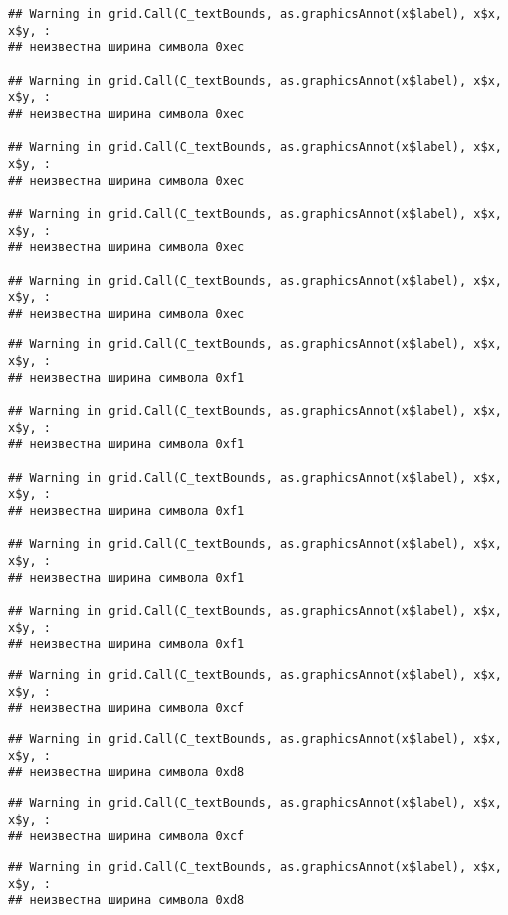 \documentclass[
]{article}
\begin{document}
\begin{verbatim}
## Warning in grid.Call(C_textBounds, as.graphicsAnnot(x$label), x$x, x$y, :
## неизвестна ширина символа 0xec

## Warning in grid.Call(C_textBounds, as.graphicsAnnot(x$label), x$x, x$y, :
## неизвестна ширина символа 0xec

## Warning in grid.Call(C_textBounds, as.graphicsAnnot(x$label), x$x, x$y, :
## неизвестна ширина символа 0xec

## Warning in grid.Call(C_textBounds, as.graphicsAnnot(x$label), x$x, x$y, :
## неизвестна ширина символа 0xec

## Warning in grid.Call(C_textBounds, as.graphicsAnnot(x$label), x$x, x$y, :
## неизвестна ширина символа 0xec
\end{verbatim}

\begin{verbatim}
## Warning in grid.Call(C_textBounds, as.graphicsAnnot(x$label), x$x, x$y, :
## неизвестна ширина символа 0xf1

## Warning in grid.Call(C_textBounds, as.graphicsAnnot(x$label), x$x, x$y, :
## неизвестна ширина символа 0xf1

## Warning in grid.Call(C_textBounds, as.graphicsAnnot(x$label), x$x, x$y, :
## неизвестна ширина символа 0xf1

## Warning in grid.Call(C_textBounds, as.graphicsAnnot(x$label), x$x, x$y, :
## неизвестна ширина символа 0xf1

## Warning in grid.Call(C_textBounds, as.graphicsAnnot(x$label), x$x, x$y, :
## неизвестна ширина символа 0xf1
\end{verbatim}

\begin{verbatim}
## Warning in grid.Call(C_textBounds, as.graphicsAnnot(x$label), x$x, x$y, :
## неизвестна ширина символа 0xcf
\end{verbatim}

\begin{verbatim}
## Warning in grid.Call(C_textBounds, as.graphicsAnnot(x$label), x$x, x$y, :
## неизвестна ширина символа 0xd8
\end{verbatim}

\begin{verbatim}
## Warning in grid.Call(C_textBounds, as.graphicsAnnot(x$label), x$x, x$y, :
## неизвестна ширина символа 0xcf
\end{verbatim}

\begin{verbatim}
## Warning in grid.Call(C_textBounds, as.graphicsAnnot(x$label), x$x, x$y, :
## неизвестна ширина символа 0xd8
\end{verbatim}
\end{document}
